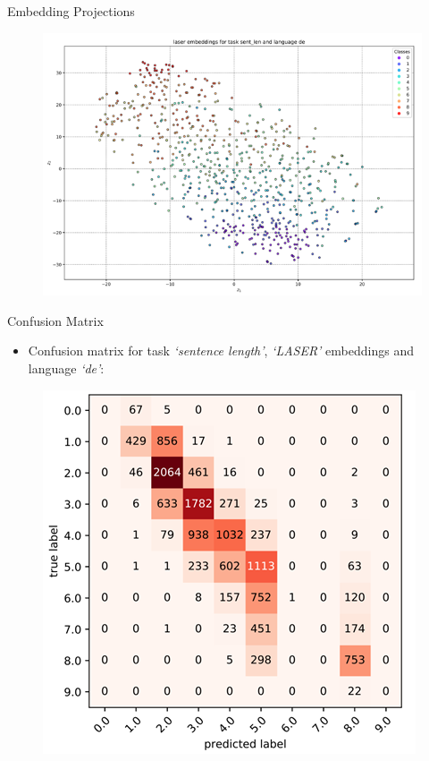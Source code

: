 \documentclass[accentcolor=tud1a,colorbacktitle,inverttitle,landscape,german,presentation,t]{tudbeamer}
\begin{document}
\begin{frame}{Embedding Projections}{}
	\vspace*{-4mm}
	\begin{figure}
		\centering
		\includegraphics[scale=0.5]{images/scatter_sent_len_laser}
	\end{figure}
\end{frame}


\begin{frame}{Confusion Matrix}{}
	\vspace*{-4mm}
	\begin{itemize}
		\item Confusion matrix for task \textit{`sentence length'}, \textit{`LASER'} embeddings and language \textit{`de'}:
	\end{itemize}

	\begin{figure}
		\centering
		\includegraphics[scale=0.45]{images/conf_mat_sent_len_laser}
	\end{figure}
\end{frame}
\end{document}
